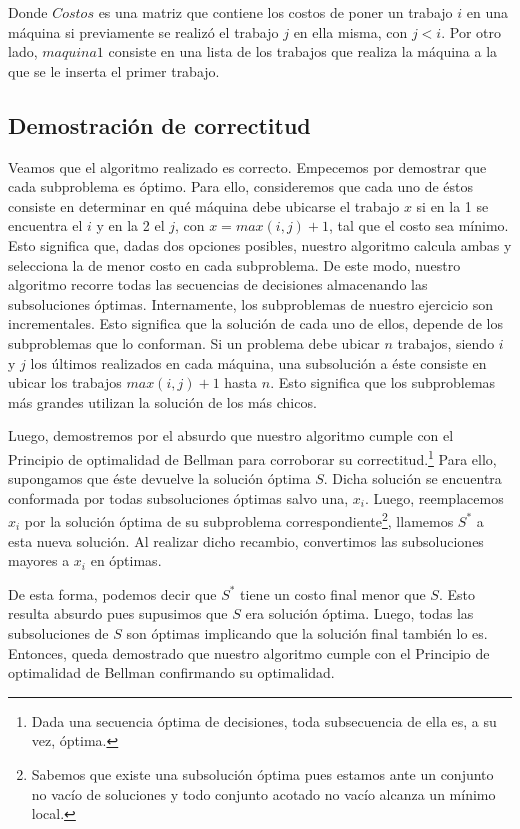Donde $Costos$ es una matriz que contiene los costos de poner un trabajo $i$ en una máquina si previamente se realizó el trabajo $j$ en ella misma, con $j<i$. Por otro lado, $maquina1$ consiste en una lista de los trabajos que realiza la máquina a la que se le inserta el primer trabajo.

\newpage
\subsection{Demostración de correctitud}

Veamos que el algoritmo realizado es correcto. Empecemos por demostrar que cada subproblema es óptimo. Para ello, consideremos que cada uno de éstos consiste en determinar en qué máquina debe ubicarse el trabajo $x$ si en la 1 se encuentra el $i$ y en la 2 el $j$, con $x=max(i,j)+1$, tal que el costo sea mínimo. Esto significa que, dadas dos opciones posibles, nuestro algoritmo calcula ambas y selecciona la de menor costo en cada subproblema. De este modo, nuestro algoritmo recorre todas las secuencias de decisiones almacenando las subsoluciones óptimas.
Internamente, los subproblemas de nuestro ejercicio son incrementales. Esto significa que la solución de cada uno de ellos, depende de los subproblemas que lo conforman. Si un problema debe ubicar $n$ trabajos, siendo $i$ y $j$ los últimos realizados en cada máquina, una subsolución a éste consiste en ubicar los trabajos $max(i,j)+1$ hasta $n$. Esto significa que los subproblemas más grandes utilizan la solución de los más chicos.

Luego, demostremos por el absurdo que nuestro algoritmo cumple con el Principio de optimalidad de Bellman para corroborar su correctitud.\footnote{Dada una secuencia óptima de decisiones, toda subsecuencia de ella es, a su vez, óptima.} Para ello, supongamos que éste devuelve la solución óptima $S$. Dicha solución se encuentra conformada por todas subsoluciones óptimas salvo una, $x_{i}$. Luego, reemplacemos $x_{i}$ por la solución óptima de su subproblema correspondiente\footnote{Sabemos que existe una subsolución óptima pues estamos ante un conjunto no vacío de soluciones y todo conjunto acotado no vacío alcanza un mínimo local.}, llamemos $S^*$ a esta nueva solución. Al realizar dicho recambio, convertimos las subsoluciones mayores a $x_{i}$ en óptimas.

 De esta forma, podemos decir que $S^*$ tiene un costo final menor que $S$. Esto resulta absurdo pues supusimos que $S$ era solución óptima. Luego, todas las subsoluciones de $S$ son óptimas implicando que la solución final también lo es. Entonces, queda demostrado que nuestro algoritmo cumple con el Principio de optimalidad de Bellman confirmando su optimalidad.

